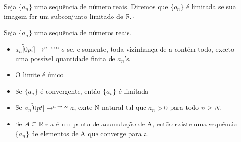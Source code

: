 \documentclass[analysis_notes.tex]{subfiles}
\begin{document}
\begin{def*}
	Seja $\{a_{n}\}$ uma sequ\^encia de n\'umero reais. Diremos que $\{a_{n}\}$ \'e limitada se sua imagem for um subconjunto
	limitado de $\mathbb{R}.\square$
\end{def*}
\begin{theorem*}
	Seja $\{a_{n}\}$ uma sequ\^encia de n\'umeros reais.
	\begin{itemize}
		\item[a)] $a_{n}\overbracket[0pt]{\longrightarrow}^{n\rightarrow\infty}a$ se, e somente, toda vizinhan\c ca de a cont\'em todo, exceto uma poss\'ivel quantidade
		      finita de $a_{n}$'s.
		\item[b)] O limite \'e \'unico.
		\item[c)] Se $\{a_{n}\}$ \'e convergente, ent\~ao $\{a_{n}\}$ \'e limitada
		\item[d)] Se $a_{n}\overbracket[0pt]{\longrightarrow}^{n\rightarrow\infty}a$, exite N natural tal que $a_{n} > 0$ para todo $n\geq{N}.$
		\item[e)] Se $A\subseteq{\mathbb{R}}$ e a \'e um ponto de acumula\c c\~ao de A, ent\~ao existe uma sequ\^encia $\{a_{n}\}$ de elementos
		      de A que converge para a.
	\end{itemize}
\end{theorem*}
\end{document}
